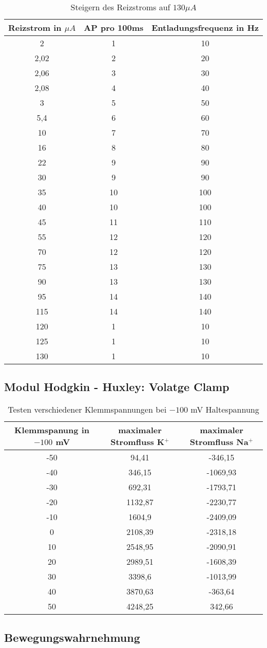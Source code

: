 \documentclass[11pt]{article}
\begin{document}
\begin{table}[H]
\caption{Steigern des Reizstroms auf $130 \mu A$}
\begin{center}
\begin{tabular}{c|c|c}
Reizstrom in $\mu A$ & AP pro 100ms & Entladungsfrequenz in Hz \\
\hline\hline
2	&	1	&	10	\\
2,02	&	2	&	20	\\
2,06	&	3	&	30	\\
2,08	&	4	&	40	\\
3	&	5	&	50	\\
5,4	&	6	&	60	\\
10	&	7	&	70	\\
16	&	8	&	80	\\
22	&	9	&	90	\\
30	&	9	&	90	\\
35	&	10	&	100	\\
40	&	10	&	100	\\
45	&	11	&	110	\\
55	&	12	&	120	\\
70	&	12	&	120	\\
75	&	13	&	130	\\
90	&	13	&	130	\\
95	&	14	&	140	\\
115	&	14	&	140	\\
120	&	1	&	10	\\
125	&	1	&	10	\\
130	&	1	&	10	
\end{tabular}
\end{center}
\label{werte}
\end{table}

\subsection{Modul Hodgkin - Huxley: Volatge Clamp}

\begin{table}[H]
\caption{Testen verschiedener Klemmspannungen bei $-100$ mV Haltespannung}
\begin{center}
\begin{tabular}{c|c|c}
Klemmspanung in $-100$ mV & maximaler Stromfluss K$^+$ & maximaler Stromfluss Na$^+$\\
\hline\hline
-50	&	94,41	&	-346,15	\\
-40	&	346,15	&	-1069,93	\\
-30	&	692,31	&	-1793,71	\\
-20	&	1132,87	&	-2230,77	\\
-10	&	1604,9	&	-2409,09	\\
0	&	2108,39	&	-2318,18	\\
10	&	2548,95	&	-2090,91	\\
20	&	2989,51	&	-1608,39	\\
30	&	3398,6	&	-1013,99	\\
40	&	3870,63	&	-363,64	\\
50	&	4248,25	&	342,66	
\end{tabular}
\end{center}
\label{werte}
\end{table}


\subsection{Bewegungswahrnehmung}
\end{document}
